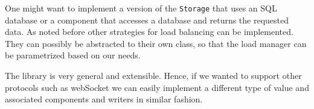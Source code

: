One might want to implement a version of the \texttt{Storage}
that uses an SQL database or a component that accesses a database and 
returns the requested data. As noted before other strategies 
for load balancing can be implemented.
They can possibly be abstracted to their own class, so that the
load manager can be parametrized based on our needs.  

The library is very general and extensible. Hence, if we wanted to support 
other protocols such as webSocket we can easily implement a different 
type of value and associated components and writers in similar fashion.

